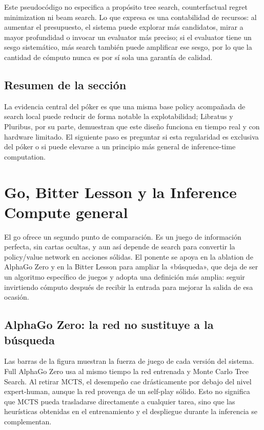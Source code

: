 \documentclass[a4paper]{article}
\begin{document}
Este pseudocódigo no especifica a propósito tree search, counterfactual regret minimization ni beam search. Lo que expresa es una contabilidad de recursos: al aumentar el presupuesto, el sistema puede explorar más candidatos, mirar a mayor profundidad o invocar un evaluator más preciso; si el evaluator tiene un sesgo sistemático, más search también puede amplificar ese sesgo, por lo que la cantidad de cómputo nunca es por sí sola una garantía de calidad.

\subsection{Resumen de la sección}

La evidencia central del póker es que una misma base policy acompañada de search local puede reducir de forma notable la explotabilidad; Libratus y Pluribus, por su parte, demuestran que este diseño funciona en tiempo real y con hardware limitado. El siguiente paso es preguntar si esta regularidad es exclusiva del póker o si puede elevarse a un principio más general de inference-time computation.
\section{Go, Bitter Lesson y la Inference Compute general}

El go ofrece un segundo punto de comparación. Es un juego de información perfecta, sin cartas ocultas, y aun así depende de search para convertir la policy/value network en acciones sólidas. El ponente se apoya en la ablation de AlphaGo Zero y en la Bitter Lesson para ampliar la «búsqueda», que deja de ser un algoritmo específico de juegos y adopta una definición más amplia: seguir invirtiendo cómputo después de recibir la entrada para mejorar la salida de esa ocasión.

\subsection{AlphaGo Zero: la red no sustituye a la búsqueda}

Las barras de la figura muestran la fuerza de juego de cada versión del sistema. Full AlphaGo Zero usa al mismo tiempo la red entrenada y Monte Carlo Tree Search. Al retirar MCTS, el desempeño cae drásticamente por debajo del nivel expert-human, aunque la red provenga de un self-play sólido. Esto no significa que MCTS pueda trasladarse directamente a cualquier tarea, sino que las heurísticas obtenidas en el entrenamiento y el despliegue durante la inferencia se complementan.
\end{document}
